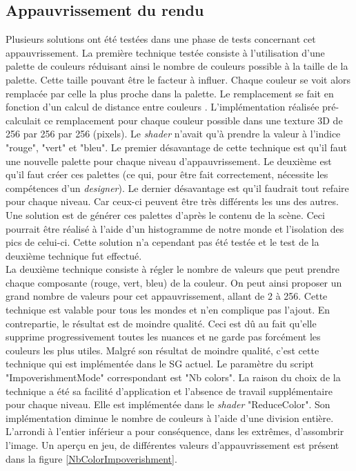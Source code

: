 	\subsection*{Appauvrissement du rendu}
		Plusieurs solutions ont été testées dans une phase de tests concernant cet appauvrissement. La première technique testée consiste à l'utilisation d'une palette de couleurs réduisant ainsi le nombre de couleurs possible à la taille de la palette. Cette taille pouvant être le facteur à influer. Chaque couleur se voit alors remplacée par celle la plus proche dans la palette. Le remplacement se fait en fonction d'un calcul de distance entre couleurs \cite{colorDiff}. L'implémentation réalisée pré-calculait ce remplacement pour chaque couleur possible dans une texture 3D de 256 par 256 par 256 (pixels). Le \textit{shader} n'avait qu'à prendre la valeur à l'indice "rouge", "vert" et "bleu". Le premier désavantage de cette technique est qu'il faut une nouvelle palette pour chaque niveau d'appauvrissement. Le deuxième est qu'il faut créer ces palettes (ce qui, pour être fait correctement, nécessite les compétences d'un \textit{designer}). Le dernier désavantage est qu'il faudrait tout refaire pour chaque niveau. Car ceux-ci peuvent être très différents les uns des autres. Une solution est de générer ces palettes d'après le contenu de la scène. Ceci pourrait être réalisé à l'aide d'un histogramme de notre monde et l'isolation des pics de celui-ci. Cette solution n'a cependant pas été testée et le test de la deuxième technique fut effectué.
		\\
		
		La deuxième technique consiste à régler le nombre de valeurs que peut prendre chaque composante (rouge, vert, bleu) de la couleur. On peut ainsi proposer un grand nombre de valeurs pour cet appauvrissement, allant de 2 à 256. Cette technique est valable pour tous les mondes et n'en complique pas l'ajout. En contrepartie, le résultat est de moindre qualité. Ceci est dû au fait qu'elle supprime progressivement toutes les nuances et ne garde pas forcément les couleurs les plus utiles. Malgré son résultat de moindre qualité, c'est cette technique qui est implémentée dans le SG actuel. Le paramètre du script "ImpoverishmentMode" correspondant est "Nb colors". La raison du choix de la technique a été sa facilité d'application et l'absence de travail supplémentaire pour chaque niveau. Elle est implémentée dans le \textit{shader} "ReduceColor". Son implémentation diminue le nombre de couleurs à l'aide d'une division entière. L'arrondi à l'entier inférieur a pour conséquence, dans les extrêmes, d'assombrir l'image. Un aperçu en jeu, de différentes valeurs d'appauvrissement est présent dans la figure \ref{NbColorImpoverishment}.\medskip
		
